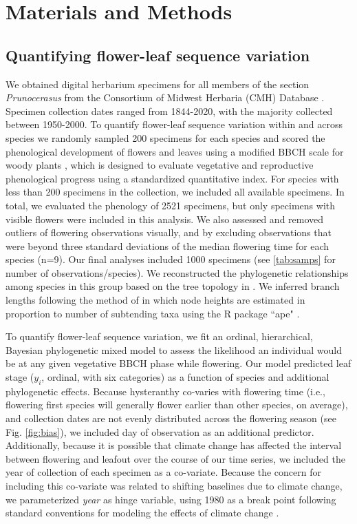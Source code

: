 \documentclass{article}[12pt]
\begin{document}
\section*{Materials and Methods}
\subsection*{Quantifying flower-leaf sequence variation}  

We obtained digital herbarium specimens for all members of the section \textit{Prunocerasus} from the Consortium of Midwest Herbaria (CMH) Database \citep{CMH}. Specimen collection dates ranged from 1844-2020, with the majority collected between 1950-2000. To quantify flower-leaf sequence variation within and across species we randomly sampled 200 specimens for each species and scored the phenological development of flowers and leaves using a modified BBCH scale for woody plants \citep{Finn2007}, which is designed to evaluate vegetative and reproductive phenological progress using a standardized quantitative index. For species with less than 200 specimens in the collection, we included all available specimens. In total, we evaluated the phenology of 2521 specimens, but only specimens with visible flowers were included in this analysis. We also assessed and removed outliers of flowering observations visually, and by excluding observations that were beyond three standard deviations of the median flowering time for each species (n=9). Our final analyses included 1000 specimens (see \ref{tab:samps} for number of observations/species). We reconstructed the phylogenetic relationships among species in this group based on the tree topology in \citet{Shaw:2004aa}. We inferred branch lengths following the method of \citet{Granfen1989} in which node heights are estimated in proportion to number of subtending taxa using the R package ``ape" \citep{Paradis2019}.

To quantify flower-leaf sequence variation, we fit an ordinal, hierarchical, Bayesian phylogenetic mixed model \citep{Garamszegi2014} to assess the likelihood an individual would be at any given vegetative BBCH phase while flowering. Our model predicted leaf stage ($y_i$, ordinal, with six categories) as a function of species and additional phylogenetic effects. Because hysteranthy co-varies with flowering time (i.e., flowering first species will generally flower earlier than other species, on average), and collection dates are not evenly distributed across the flowering season (see Fig. \ref{fig:bias}), we included day of observation as an additional predictor. Additionally, because it is possible that climate change has affected the interval between flowering and leafout over the course of our time series, we included the year of collection of each specimen as a co-variate. Because the concern for including this co-variate was related to shifting baselines due to climate change, we parameterized \emph{year} as hinge variable, using 1980 as a break point following standard conventions for modeling the effects of climate change \citep{IPCC2013,Buonaiuto2020,Kharouba2018}.
\end{document}
